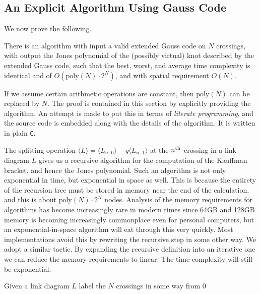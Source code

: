     \subsection{An Explicit Algorithm Using Gauss Code}
        We now prove the following.
        \begin{theorem}
            There is an algorithm with input a valid extended Gauss code on $N$
            crossings, with output the Jones polynomial of the (possibly virtual)
            knot described by the extended Gauss code, such that the best, worst,
            and average time complexity is identical and of
            $O(\textrm{poly}(N)\cdot{2}^{N})$, and with spatial requirement $O(N)$.
        \end{theorem}
        If we assume certain arithmetic operations are constant, then
        $\textrm{poly}(N)$ can be replaced by $N$. The proof is contained in
        this section by explicitly providing the algorithm. An attempt is made
        to put this in terms of \textit{literate programming}, and the source
        code is embedded along with the details of the algorithm. It is written
        in plain \texttt{C}.
        \par\hfill\par
        The splitting operation
        $\langle{L}\rangle=\langle{L_{n,\,0}}\rangle-q\langle{L_{n,\,1}}\rangle$
        at the $n^{\small\textrm{th}}$ crossing in a link diagram $L$ gives us a
        recursive algorithm for the computation of the Kauffman bracket,
        and hence the Jones polynomial. Such an algorithm is not only
        exponential in time, but exponential in space as well. This is because
        the entirety of the recursion tree must be stored in memory near the
        end of the calculation, and this is about
        $\textrm{poly}(N)\cdot{2}^{N}$ nodes. Analysis of the
        memory requirements for algorithms has become increasingly rare in
        modern times since 64GB and 128GB memory is becoming increasingly
        commonplace even for personal computers, but an exponential-in-space
        algorithm will eat through this very quickly. Most implementations
        avoid this by rewriting the recursive step in some other way.
        We adopt a similar tactic. By expanding the
        recursive definition into an iterative one we can reduce the memory
        requirements to linear. The time-complexity will still be exponential.
        \par\hfill\par
        Given a link diagram $L$ label the $N$ crossings in some way from $0$
